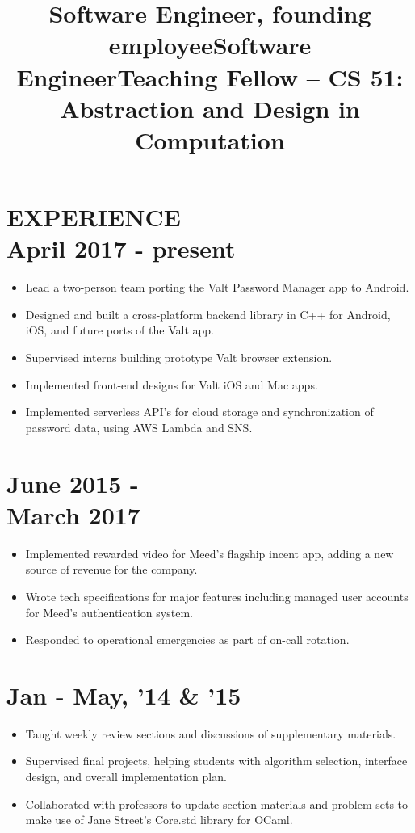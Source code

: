 \documentclass[centered, margin, 10pt]{res} %
\newcommand\mainsectionfont{\normalsize\bf\textup}
\newcommand\subsectionfont{\small\textmd\textup}
\renewcommand\sectionfont{\mainsectionfont} %
\renewcommand\dates{\section} %
\newenvironment{rlist}
    {\begin{minipage}[t]{\linewidth}\begin{itemize}\raggedright}
    {\end{itemize}\end{minipage}}
\newenvironment{positionlist}
    {\begin{position}\begin{rlist}}
    {\end{rlist}\end{position}}
\begin{document}
\begin{resume}

\renewcommand\sectionfont{\subsectionfont} %


\section{{\mainsectionfont EXPERIENCE} \\ April 2017 - present }
\title{Software Engineer, founding employee}
\begin{positionlist}
  \item Lead a two-person team porting the Valt Password Manager app
    to Android.
  \item Designed and built a cross-platform backend library in C++ for Android, iOS,
    and future ports of the Valt app.
  \item Supervised interns building prototype Valt browser extension.
  \item Implemented front-end designs for Valt iOS and Mac apps.
  \item Implemented serverless API's for cloud storage and synchronization
    of password data, using AWS Lambda and SNS.
\end{positionlist}

\title{Software Engineer}
\dates{June 2015 - \\ March 2017}
\begin{positionlist}
  \item Implemented rewarded video for Meed's flagship incent app, adding a new
    source of revenue for the company.
  \item Wrote tech specifications for major features including managed user
    accounts for Meed's authentication system.
  \item Responded to operational emergencies as part of on-call rotation.
\end{positionlist}

\title{Teaching Fellow -- CS 51: Abstraction and Design in Computation}
\dates{Jan - May, '14 \& '15}
\begin{positionlist}
  \item Taught weekly review sections and discussions of supplementary
    materials.
  \item Supervised final projects, helping students with algorithm selection,
    interface design, and overall implementation plan.
  \item Collaborated with professors to update section materials and problem
    sets to make use of Jane Street's Core.std library for OCaml.
\end{positionlist}


\end{resume}
\end{document}
